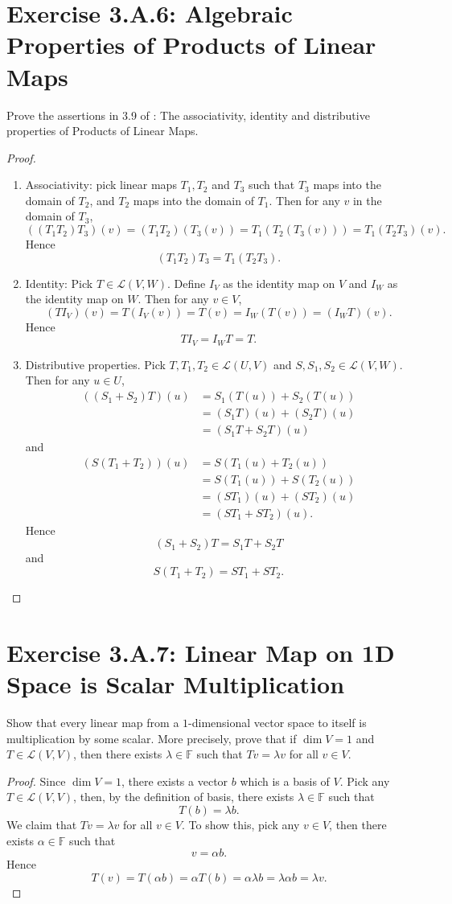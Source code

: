 \section{Exercise 3.A.6: Algebraic Properties of Products of Linear Maps}
Prove the assertions in 3.9 of \cite{axler2014linear}: The associativity, identity and distributive properties of Products of Linear Maps.
\begin{proof}
\begin{enumerate}
\item Associativity: pick linear maps $T_1, T_2$ and $T_3$ such that $T_3$ maps into the domain of $T_2$, and $T_2$ maps into the domain of $T_1$. Then for any $v$ in the domain of $T_3$,\[
((T_1T_2)T_3)(v)=(T_1T_2)(T_3(v))=T_1(T_2(T_3(v)))=T_1(T_2T_3)(v).
\]Hence\[
(T_1T_2)T_3=T_1(T_2T_3).
\]
\item Identity: Pick $T\in\mathcal{L}(V,W)$. Define $I_V$ as the identity map on $V$ and $I_W$ as the identity map on $W$. Then for any $v\in V$,\[
(TI_V)(v)=T(I_V(v))=T(v)=I_W(T(v))=(I_WT)(v).
\]Hence\[
TI_V=I_WT=T.
\]
\item Distributive properties. Pick $T,T_1,T_2\in\mathcal{L}(U,V)$ and $S,S_1,S_2\in\mathcal{L}(V,W)$. Then for any $u\in U$,\[
\begin{split}
((S_1+S_2)T)(u)&=S_1(T(u))+S_2(T(u))\\
&=(S_1T)(u)+(S_2T)(u)\\
&=(S_1T+S_2T)(u)
\end{split}
\]and\[
\begin{split}
(S(T_1+T_2))(u)&=S(T_1(u)+T_2(u))\\
&=S(T_1(u))+S(T_2(u))\\
&=(ST_1)(u)+(ST_2)(u)\\
&=(ST_1+ST_2)(u).
\end{split}
\]Hence\[
(S_1+S_2)T=S_1T+S_2T
\]and\[
S(T_1+T_2)=ST_1+ST_2.
\]
\end{enumerate}
\end{proof}
\section{Exercise 3.A.7: Linear Map on 1D Space is Scalar Multiplication}
Show that every linear map from a $1$-dimensional vector space to itself is multiplication by some scalar. More precisely, prove that if $\dim V=1$ and $T\in\mathcal{L}(V,V)$, then there exists $\lambda\in\mathbb{F}$ such that $Tv=\lambda v$ for all $v\in V$.
\begin{proof}
Since $\dim V=1$, there exists a vector $b$ which is a basis of $V$. Pick any $T\in\mathcal{L}(V,V)$, then, by the definition of basis, there exists $\lambda\in\mathbb{F}$ such that\[
T(b)=\lambda b.
\]We claim that $Tv=\lambda v$ for all $v\in V$. To show this, pick any $v\in V$, then there exists $\alpha\in\mathbb{F}$ such that\[
v=\alpha b.
\]Hence\[
T(v)=T(\alpha b)=\alpha T(b)=\alpha \lambda b=\lambda\alpha b=\lambda v.
\]
\end{proof}

